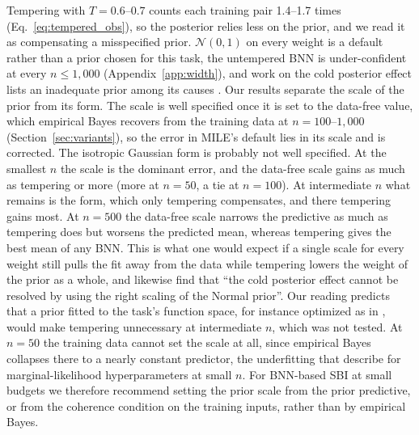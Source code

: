 \documentclass[11pt]{article}
\begin{document}
\label{sec:disc_adjust}
Tempering with $T=0.6$--$0.7$ counts each training pair 1.4--1.7 times (Eq.~\eqref{eq:tempered_obs}), so the posterior
relies less on the prior, and we read it as compensating a misspecified prior. $\mathcal N(0,1)$ on every weight is a
default rather than a prior chosen for this task, the untempered BNN is under-confident at every $n\le1{,}000$
(Appendix~\ref{app:width}), and work on the cold posterior effect lists an inadequate prior among its causes
\citep{wenzel2020cold,fortuin2022priors}. Our results separate the scale of the prior from its form. The scale is well
specified once it is set to the data-free value, which empirical Bayes recovers from the training data at
$n=100$--$1{,}000$ (Section~\ref{sec:variants}), so the error in MILE's default lies in its scale and is corrected. The
isotropic Gaussian form is probably not well specified. At the smallest $n$ the scale is the dominant error, and the
data-free scale gains as much as tempering or more (more at $n=50$, a tie at $n=100$). At intermediate $n$ what remains
is the form, which only tempering compensates, and there tempering gains most. At $n=500$ the data-free scale narrows
the predictive as much as tempering does but worsens the predicted mean, whereas tempering gives the best mean of any
BNN. This is what one would expect if a single scale for every weight still pulls the fit away from the data while
tempering lowers the weight of the prior as a whole, and \citet{wenzel2020cold} likewise find that ``the cold posterior
effect cannot be resolved by using the right scaling of the Normal prior''. Our reading predicts that a prior fitted to
the task's function space, for instance optimized as in \citet{delaunoy2024lowbudget}, would make tempering unnecessary
at intermediate $n$, which was not tested. At $n=50$ the training data cannot set the scale at all, since empirical
Bayes collapses there to a nearly constant predictor, the underfitting that \citet{lotfi2022bayesian} describe for
marginal-likelihood hyperparameters at small $n$. For BNN-based SBI at small budgets we therefore recommend setting the
prior scale from the prior predictive, or from the coherence condition on the training inputs, rather than by empirical
Bayes.
\end{document}
